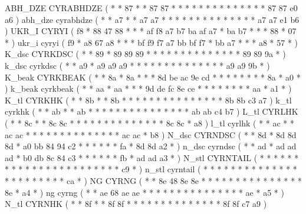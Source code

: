 \makeCOD ABH_DZE      CYRABHDZE         ( *  *       87 *   *  87 87 *     *  *  *  *  *     *  *  *  *     *  *  *     *   87 87   e0 a6  )
\makecod abh_dze      cyrabhdze         ( *  *       a7 *   *  a7 a7 *     *  *  *  *  *     *  *  *  *     *  *  *     *   a7 a7   e1 b6  )
\makeCOD UKR_I        CYRYI             ( f8 *       88 47  88 *  *  *     af f8 a7 b7 ba    af a7 *  ba    b7 *  *     *   88 *    07 *   )
\makecod ukr_i        cyryi             ( f9 *       a8 67  a8 *  *  *     bf f9 f7 a7 bb    bf f7 *  bb    a7 *  *     *   a8 *    57 *   )
\makeCOD K_dsc        CYRKDSC           ( *  *       89 *   89 89 89 *     *  *  *  *  *     *  *  *  *     *  *  *     *   89 89   9a *   )
\makecod k_dsc        cyrkdsc           ( *  *       a9 *   a9 a9 a9 *     *  *  *  *  *     *  *  *  *     *  *  *     *   a9 a9   9b *   )
\makeCOD K_beak       CYRKBEAK          ( *  *       8a *   8a *  *  *     8d be ac 9e cd    *  *  *  *     *  *  *     *   8a *    a0 *   )
\makecod k_beak       cyrkbeak          ( *  *       aa *   aa *  *  *     9d de fc 8e ce    *  *  *  *     *  *  *     *   aa *    a1 *   )
\makeCOD K_tl         CYRKHK            ( *  *       8b *   *  8b *  *     *  *  *  *  *     *  *  *  *     *  *  *     *   8b 8b   c3 a7  )
\makecod k_tl         cyrkhk            ( *  *       ab *   *  ab *  *     *  *  *  *  *     *  *  *  *     *  *  *     *   ab ab   c4 b7  )
\makeCOD L_tl         CYRLHK            ( *  *       8c *   *  8c 8c *     *  *  *  *  *     *  *  *  *     *  *  *     *   8c 8c   *  a8  )
\makecod l_tl         cyrlhk            ( *  *       ac *   *  ac ac *     *  *  *  *  *     *  *  *  *     *  *  *     *   ac ac   *  b8  )
\makeCOD N_dsc        CYRNDSC           ( *  *       8d *   8d 8d 8d *     a0 bb 84 94 c2    *  *  *  *     *  *  fa    *   8d 8d   a2 *   )
\makecod n_dsc        cyrndsc           ( *  *       ad *   ad ad ad *     b0 db 8c 84 c3    *  *  *  *     *  *  fb    *   ad ad   a3 *   )
\makeCOD N_stl        CYRNTAIL          ( *  *       *  *   *  *  *  *     *  *  *  *  *     *  *  *  *     *  *  *     *   *  *    c9 *   )
\makecod n_stl        cyrntail          ( *  *       *  *   *  *  *  *     *  *  *  *  *     *  *  *  *     *  *  *     *   *  *    ca *   )
\makeCOD NG           CYRNG             ( *  *       8e 48  8e 8e *  *     *  *  *  *  *     *  *  *  *     *  *  *     *   8e *    a4 *   )
\makecod ng           cyrng             ( *  *       ae 68  ae ae *  *     *  *  *  *  *     *  *  *  *     *  *  *     *   ae *    a5 *   )
\makeCOD N_tl         CYRNHK            ( *  *       8f *   *  8f 8f *     *  *  *  *  *     *  *  *  *     *  *  *     *   8f 8f   c7 a9  )
